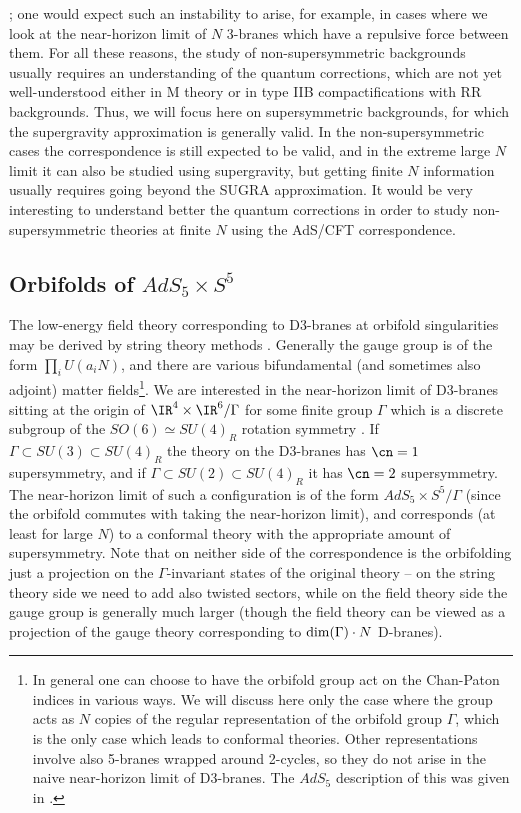 \cite{Brown:1988kg,Dowker:1996sg,Maldacena:1999uz,Seiberg:1999xz}; 
one would expect such an instability to arise, for example,
in cases where we look at the near-horizon limit of $N$ 3-branes which
have a repulsive force between them. For all these reasons, the study
of non-supersymmetric backgrounds usually requires an understanding of
the quantum corrections, which are not yet well-understood either in
M theory or in type IIB compactifications with RR backgrounds. Thus,
we will focus here on supersymmetric backgrounds, for which the
supergravity approximation is generally valid. In the
non-supersymmetric cases the correspondence is still expected to be
valid, and in the extreme large $N$ limit it can also be studied using
supergravity, but getting finite $N$ information usually requires
going beyond the SUGRA approximation. It would be very interesting to
understand better the quantum corrections in order to study
non-supersymmetric theories at finite $N$ using the AdS/CFT
correspondence.

\subsection{Orbifolds of $AdS_5\times S^5$}
\label{orbifolds}

The low-energy field theory corresponding to D3-branes at orbifold
singularities may be derived by string theory methods
\cite{Douglas:1996sw,Douglas:1997de}. 
Generally the gauge group is of the form $\prod_i U(a_i N)$, and there
are various bifundamental (and sometimes also adjoint) matter
fields\footnote{In general one can choose to have the orbifold group
act on the Chan-Paton indices in various ways. We will discuss here
only the case where the group acts as $N$ copies of the regular
representation of the orbifold group $\Gamma$, which is the only case
which leads to conformal theories. Other representations involve also
5-branes wrapped around 2-cycles, so they do not arise in the naive
near-horizon limit of D3-branes. The $AdS_5$ description of this was
given in \cite{Gubser:1998fp}.}. We are interested in the near-horizon
limit of D3-branes sitting at the origin of $\IR^4 \times
\IR^6/\Gamma$ for some finite group $\Gamma$ which is a discrete
subgroup of the $SO(6)
\simeq SU(4)_R$ rotation symmetry \cite{Kachru:1998ys}. 
If $\Gamma \subset SU(3) \subset
SU(4)_R$ the theory on the D3-branes has $\cn=1$ supersymmetry, and if
$\Gamma \subset SU(2) \subset SU(4)_R$ it has $\cn=2$
supersymmetry. The near-horizon limit of such a configuration is of
the form $AdS_5 \times S^5/\Gamma$ (since the orbifold commutes with
taking the near-horizon limit), and corresponds (at least for large
$N$) to a conformal theory with the appropriate amount of
supersymmetry. Note that on neither side of the correspondence is the
orbifolding just a projection on the $\Gamma$-invariant states of the
original theory -- on the string theory side we need to add also
twisted sectors, while on the field theory side the gauge group is
generally much larger (though the field theory 
can be viewed as a projection of the
gauge theory corresponding to ${\rm dim}(\Gamma)\cdot N$ D-branes).


